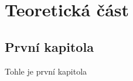 \part{Teoretická část}

\hypertarget{prvnuxed-kapitola}{%
\chapter{První kapitola}\label{prvnuxed-kapitola}}

Tohle je první kapitola~\parencite{nespor05}
